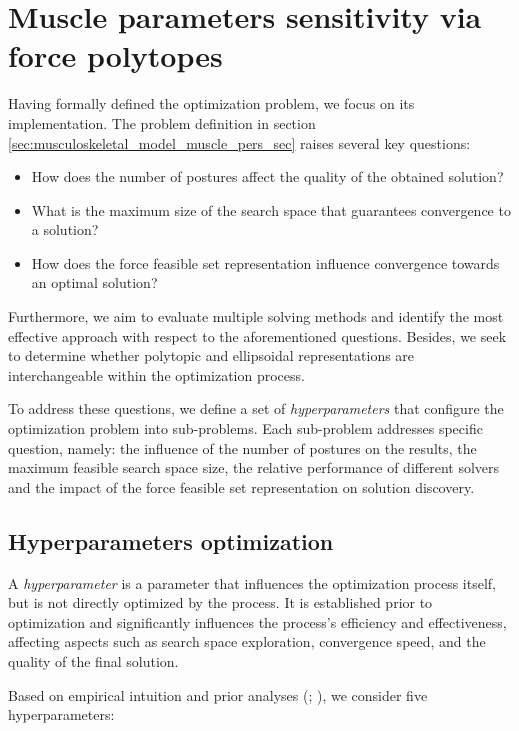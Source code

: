 \section{Muscle parameters sensitivity via force polytopes}
\label{sec:personalization_silico_polytopes}

Having formally defined the optimization problem, we focus on its implementation. The problem definition in section \ref{sec:musculoskeletal_model_muscle_pers_sec} raises several key questions:

\begin{itemize}[noitemsep]
    \item {How does the number of postures affect the quality of the obtained solution?}
    \item {What is the maximum size of the search space that guarantees convergence to a solution?}
    \item {How does the force feasible set representation influence convergence towards an optimal solution?}
\end{itemize}

Furthermore, we aim to evaluate multiple solving methods and identify the most effective approach with respect to the aforementioned questions. Besides, we seek to determine whether polytopic and ellipsoidal representations are interchangeable within the optimization process.

To address these questions, we define a set of \emph{hyperparameters} that configure the optimization problem into sub-problems. Each sub-problem addresses specific question, namely: the influence of the number of postures on the results, the maximum feasible search space size, the relative performance of different solvers and the impact of the force feasible set representation on solution discovery.

\subsection{Hyperparameters optimization}

A \emph{hyperparameter} is a parameter that influences the optimization process itself, but is not directly optimized by the process. It is established prior to optimization and significantly influences the process's efficiency and effectiveness, affecting aspects such as search space exploration, convergence speed, and the quality of the final solution.

Based on empirical intuition and prior analyses (\cite{laisneGeneticAlgorithmsForce2023}; \cite{laisneDerivativeFreeOptimizationApproaches2023}), we consider five hyperparameters:

